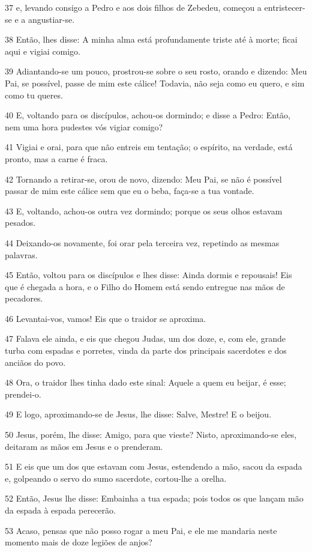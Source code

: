 \par 37 e, levando consigo a Pedro e aos dois filhos de Zebedeu, começou a entristecer-se e a angustiar-se.
\par 38 Então, lhes disse: A minha alma está profundamente triste até à morte; ficai aqui e vigiai comigo.
\par 39 Adiantando-se um pouco, prostrou-se sobre o seu rosto, orando e dizendo: Meu Pai, se possível, passe de mim este cálice! Todavia, não seja como eu quero, e sim como tu queres.
\par 40 E, voltando para os discípulos, achou-os dormindo; e disse a Pedro: Então, nem uma hora pudestes vós vigiar comigo?
\par 41 Vigiai e orai, para que não entreis em tentação; o espírito, na verdade, está pronto, mas a carne é fraca.
\par 42 Tornando a retirar-se, orou de novo, dizendo: Meu Pai, se não é possível passar de mim este cálice sem que eu o beba, faça-se a tua vontade.
\par 43 E, voltando, achou-os outra vez dormindo; porque os seus olhos estavam pesados.
\par 44 Deixando-os novamente, foi orar pela terceira vez, repetindo as mesmas palavras.
\par 45 Então, voltou para os discípulos e lhes disse: Ainda dormis e repousais! Eis que é chegada a hora, e o Filho do Homem está sendo entregue nas mãos de pecadores.
\par 46 Levantai-vos, vamos! Eis que o traidor se aproxima.
\par 47 Falava ele ainda, e eis que chegou Judas, um dos doze, e, com ele, grande turba com espadas e porretes, vinda da parte dos principais sacerdotes e dos anciãos do povo.
\par 48 Ora, o traidor lhes tinha dado este sinal: Aquele a quem eu beijar, é esse; prendei-o.
\par 49 E logo, aproximando-se de Jesus, lhe disse: Salve, Mestre! E o beijou.
\par 50 Jesus, porém, lhe disse: Amigo, para que vieste? Nisto, aproximando-se eles, deitaram as mãos em Jesus e o prenderam.
\par 51 E eis que um dos que estavam com Jesus, estendendo a mão, sacou da espada e, golpeando o servo do sumo sacerdote, cortou-lhe a orelha.
\par 52 Então, Jesus lhe disse: Embainha a tua espada; pois todos os que lançam mão da espada à espada perecerão.
\par 53 Acaso, pensas que não posso rogar a meu Pai, e ele me mandaria neste momento mais de doze legiões de anjos?
